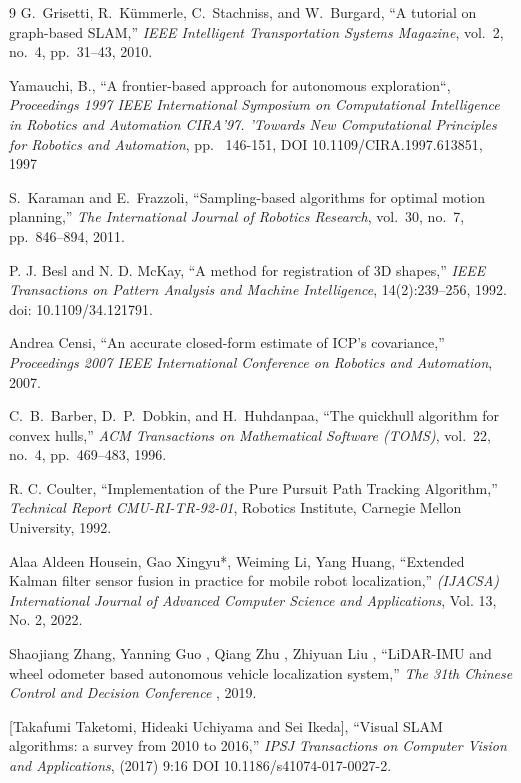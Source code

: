 \documentclass[11pt]{article}
\begin{document}
\begin{thebibliography}{9}
	G.~Grisetti, R.~K{\"u}mmerle, C.~Stachniss, and W.~Burgard,
	``A tutorial on graph-based SLAM,''
	\emph{IEEE Intelligent Transportation Systems Magazine},
	vol.~2, no.~4, pp.~31--43, 2010.
	
	Yamauchi, B.,
	``A frontier-based approach for autonomous exploration``,
	\emph{Proceedings 1997 IEEE International Symposium on Computational Intelligence in Robotics and Automation CIRA'97. 'Towards New Computational Principles for Robotics and Automation},
	pp.~ 146-151, DOI 10.1109/CIRA.1997.613851, 1997
	
	
	S.~Karaman and E.~Frazzoli, 
	``Sampling-based algorithms for optimal motion planning,''
	\emph{The International Journal of Robotics Research}, 
	vol.~30, no.~7, pp.~846--894, 2011.
	
	P. J. Besl and N. D. McKay, 
	``A method for registration of 3D shapes,''
	\emph{IEEE Transactions on Pattern Analysis and Machine Intelligence}, 
	14(2):239–256,
	1992. doi: 10.1109/34.121791.
	
	
	Andrea Censi, 
	``An accurate closed-form estimate of ICP’s covariance,''
	\emph{ Proceedings 2007 IEEE International Conference on Robotics and Automation}, 
	2007.
	
	
	C.~B.~Barber, D.~P.~Dobkin, and H.~Huhdanpaa,
	``The quickhull algorithm for convex hulls,''
	\emph{ACM Transactions on Mathematical Software (TOMS)},
	vol.~22, no.~4, pp.~469--483, 1996.
	
	R. C. Coulter,
	``Implementation of the Pure Pursuit Path Tracking Algorithm,''
	\emph{Technical Report CMU-RI-TR-92-01},
	Robotics Institute, Carnegie Mellon University, 1992.
	
	Alaa Aldeen Housein, Gao Xingyu*, Weiming Li, Yang Huang,
	``Extended Kalman filter sensor fusion in practice for mobile robot localization,''
	\emph{(IJACSA) International Journal of Advanced Computer Science and Applications},
	Vol. 13, No. 2, 2022.
	
	Shaojiang Zhang, Yanning Guo
	, Qiang Zhu , Zhiyuan Liu ,
	``LiDAR-IMU and wheel odometer based autonomous vehicle localization system,''
	\emph{The 31th Chinese Control and Decision Conference },
	2019.
	
	[Takafumi Taketomi, Hideaki Uchiyama and Sei Ikeda],
	``Visual SLAM algorithms: a survey from
	2010 to 2016,''
	\emph{IPSJ Transactions on Computer Vision and
		Applications},
	(2017) 9:16
	DOI 10.1186/s41074-017-0027-2.
		

\end{thebibliography}
\end{document}
